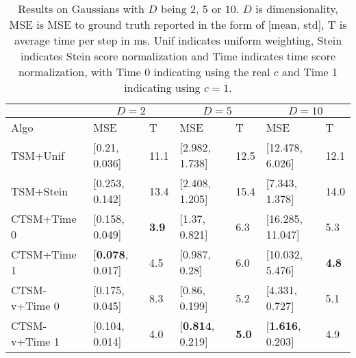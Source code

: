 \begin{table*}
        \begin{center}
        \caption{Results on Gaussians with $D$ being $2$, $5$ or $10$. $D$ is dimensionality, MSE is MSE to ground truth reported in the form of [mean, std], T is average time per step in ms. Unif indicates uniform weighting, Stein indicates Stein score normalization and Time indicates time score normalization, with Time 0 indicating using the real $c$ and Time 1 indicating using $c=1$.}
                \begin{tabular}{|l|l|l|l|l|l|l|}
                        \hline
                        & \multicolumn{2}{|c|}{$D=2$} & \multicolumn{2}{|c|}{$D=5$} & \multicolumn{2}{|c|}{$D=10$} \\
                        \hline
                        Algo & MSE & T & MSE & T & MSE & T \\
                        \hline
                        TSM+Unif & [0.21, 0.036] & 11.1 & [2.982, 1.738] & 12.5 & [12.478, 6.026] & 12.1 \\
                        \hline
                        TSM+Stein & [0.253, 0.142] & 13.4 & [2.408, 1.205] & 15.4 & [7.343, 1.378] & 14.0 \\
                        \hline
                        CTSM+Time 0 & [0.158, 0.049] & \textbf{3.9} & [1.37, 0.821] & 6.3 & [16.285, 11.047] & 5.3 \\
                        \hline
                        CTSM+Time 1 & [\textbf{0.078}, 0.017] & 4.5 & [0.987, 0.28] & 6.0 & [10.032, 5.476] & \textbf{4.8} \\
                        \hline
                        CTSM-v+Time 0 & [0.175, 0.045] & 8.3 & [0.86, 0.199] & 5.2 & [4.331, 0.727] & 5.1 \\
                        \hline
                        CTSM-v+Time 1 & [0.104, 0.014] & 4.0 & [\textbf{0.814}, 0.219] & \textbf{5.0} & [\textbf{1.616}, 0.203] & 4.9 \\
                        \hline
                \end{tabular}
        \label{tbl:gaussians1}
        \end{center}
\end{table*}

